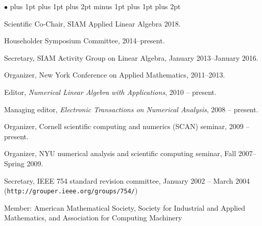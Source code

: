 \documentclass{article}
\newenvironment{icompact}{
  \begin{list}{$\bullet$}{
    \parsep 0pt plus 1pt
    \partopsep 0pt plus 1pt
    \topsep 2pt plus 2pt minus 1pt
    \itemsep 0pt plus 1pt
    \parskip 0pt plus 2pt
    \leftmargin 0.3in}
       \raggedright}
  {\normalsize\end{list}}
\begin{document}
\begin{icompact}
  \item Scientific Co-Chair, SIAM Applied Linear Algebra 2018.
  \item Householder Symposium Committee, 2014--present.
  \item Secretary, SIAM Activity Group on Linear Algebra, January
    2013--January 2016.
  \item Organizer, New York Conference on Applied Mathematics, 2011--2013.
  \item Editor, {\em Numerical Linear Algebra with Applications},
        2010 -- present.
  \item Managing editor,
        {\em Electronic Transactions on Numerical Analysis},
        2008 -- present.
  \item Organizer, Cornell scientific computing and numerics (SCAN) seminar,
        2009 -- present.
  \item Organizer, NYU numerical analysis and scientific computing seminar,
        Fall 2007--Spring 2009.
  \item Secretary, IEEE 754 standard revision committee,
        January 2002 -- March 2004
        (\verb+http://grouper.ieee.org/groups/754/+)
  \item Member: American Mathematical Society,
        Society for Industrial and Applied Mathematics,
        and Association for Computing Machinery
\end{icompact}




\end{document}
